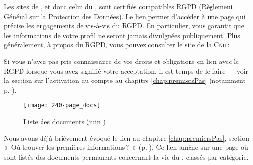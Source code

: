 
\label{sec:rgpd}
Les sites de \CF, et donc celui du \CdS, sont certifiés compatibles RGPD (Règlement Général sur la Protection des Données). Le lien  permet d’accéder à une page qui précise les engagements de \CF{} vis-à-vis du RGPD. En particulier, \CF{} vous garantit que les informations de votre profil ne seront jamais divulguées publiquement.
Plus généralement, à propos du RGPD, vous pouvez consulter le site de la \textsc{Cnil}:

\smallskip

\begin{center}
\end{center}

\smallskip

Si vous n’avez pas pris connaissance de vos droits et obligations en lien avec le RGPD lorsque vous avez signifié votre acceptation, il est temps de le faire --- voir la section sur l'activation du compte au chapitre \ref{chap:premiersPas} (notamment p. \pageref{page:accepteRgpd}). 

\label{sec:docs}

\begin{figure}
    \texttt{[image: 240-page\_docs]}
    \caption[Liste des documents]{Liste des documents (juin )}
    \label{fig:listeDocuments}
\end{figure}
Nous avons déjà brièvement évoqué le lien  au chapitre \ref{chap:premiersPas}, section «~Où trouver les premières informations\,?~» (p. \pageref{page:premieresInfos}). Ce lien amène sur une page où sont listés des documents permanents concernant la vie du \sel, classés par catégorie.

